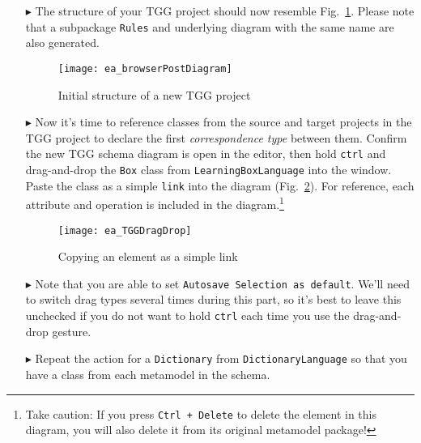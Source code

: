 \begin{itemize}
\item[$\blacktriangleright$] The structure of your TGG project should now resemble Fig.~\ref{ea:new_tgg_project}. Please note that a subpackage \texttt{Rules}
and underlying diagram with the same name are also generated.

\begin{figure}[htbp]
\begin{center}
  \texttt{[image: ea\_browserPostDiagram]}
  \caption{Initial structure of a new TGG project}  
  \label{ea:new_tgg_project}
\end{center}
\end{figure}
\end{itemize}
\clearpage

\begin{itemize}

\item[$\blacktriangleright$] Now it's time to reference classes from the source and target projects in the TGG project to declare the first \emph{correspondence
type} between them. Confirm the new TGG schema diagram is open in the editor, then hold \texttt{ctrl} and drag-and-drop the \texttt{Box} class from
\texttt{Learning\-Box\-Language} into the window. Paste the class as a simple \texttt{link} into the diagram (Fig.~\ref{ea:TGGdragDrop}). For reference, each
attribute and operation is included in the diagram.\footnote{Take caution: If you press \texttt{Ctrl + Delete} to delete the element in this diagram,
you will also delete it from its original metamodel package!}

\vspace{0.5cm}

\begin{figure}[htbp]
\begin{center}
  \texttt{[image: ea\_TGGDragDrop]}
  \caption{Copying an element as a simple link} 
  \label{ea:TGGdragDrop}
\end{center}
\end{figure}

\item[$\blacktriangleright$] Note that you are able to set \texttt{Autosave Selection as default}. We'll need to switch drag types several times during this
part, so it's best to leave this unchecked if you do not want to hold \texttt{ctrl} each time you use the drag-and-drop gesture.

\vspace{0.5cm}

\item[$\blacktriangleright$] Repeat the action for a \texttt{Dictionary} from \texttt{DictionaryLanguage} so that you have a class from each metamodel in the
schema.


\end{itemize}
